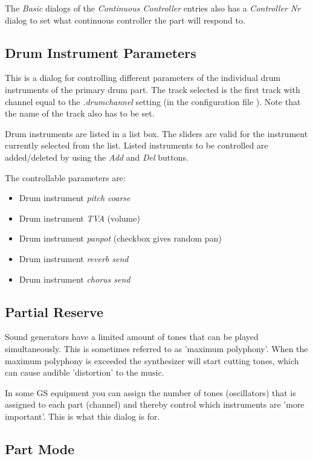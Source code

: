 \documentclass[letterpaper]{report}
\begin{document}
The {\em Basic} dialogs of the {\em Continuous Controller} entries also has
a {\em Controller Nr} dialog to set what continuous controller the part
will respond to.


\subsection{Drum Instrument Parameters}

This is a dialog for controlling different parameters of the individual drum
instruments of the primary drum part. The track selected is the first track
with channel equal to the {\em .drumchannel} setting (in the configuration
file ). Note that the name of the track also has to be set.

Drum instruments are listed in a list box. The sliders are valid for the
instrument currently selected from the list. Listed instruments to be
controlled are added/deleted by using the {\em Add} and {\em Del} buttons.

The controllable parameters are:

\begin{itemize}
\item Drum instrument {\em pitch coarse}
\item Drum instrument {\em TVA} (volume)
\item Drum instrument {\em panpot} (checkbox gives random pan)
\item Drum instrument {\em reverb send}
\item Drum instrument {\em chorus send}
\end{itemize}


\subsection{Partial Reserve}

Sound generators have a limited amount of tones that can be played
simultaneously. This is sometimes referred to as 'maximum polyphony'.
When the maximum polyphony is exceeded the synthesizer will start
cutting tones, which can cause audible 'distortion' to the music.

In some GS equipment you can assign the number of tones (oscillators)
that is assigned to each part (channel) and thereby control which instruments
are 'more important'. This is what this dialog is for.

\subsection{Part Mode}
\end{document}

